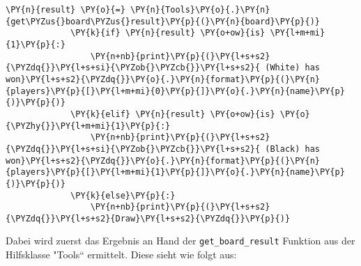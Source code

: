 \begin{Verbatim}[commandchars=\\\{\}]
             \PY{n}{result} \PY{o}{=} \PY{n}{Tools}\PY{o}{.}\PY{n}{get\PYZus{}board\PYZus{}result}\PY{p}{(}\PY{n}{board}\PY{p}{)}
             \PY{k}{if} \PY{n}{result} \PY{o+ow}{is} \PY{l+m+mi}{1}\PY{p}{:}
                 \PY{n+nb}{print}\PY{p}{(}\PY{l+s+s2}{\PYZdq{}}\PY{l+s+si}{\PYZob{}\PYZcb{}}\PY{l+s+s2}{ (White) has won}\PY{l+s+s2}{\PYZdq{}}\PY{o}{.}\PY{n}{format}\PY{p}{(}\PY{n}{players}\PY{p}{[}\PY{l+m+mi}{0}\PY{p}{]}\PY{o}{.}\PY{n}{name}\PY{p}{)}\PY{p}{)}
             \PY{k}{elif} \PY{n}{result} \PY{o+ow}{is} \PY{o}{\PYZhy{}}\PY{l+m+mi}{1}\PY{p}{:}
                 \PY{n+nb}{print}\PY{p}{(}\PY{l+s+s2}{\PYZdq{}}\PY{l+s+si}{\PYZob{}\PYZcb{}}\PY{l+s+s2}{ (Black) has won}\PY{l+s+s2}{\PYZdq{}}\PY{o}{.}\PY{n}{format}\PY{p}{(}\PY{n}{players}\PY{p}{[}\PY{l+m+mi}{1}\PY{p}{]}\PY{o}{.}\PY{n}{name}\PY{p}{)}\PY{p}{)}
             \PY{k}{else}\PY{p}{:}
                 \PY{n+nb}{print}\PY{p}{(}\PY{l+s+s2}{\PYZdq{}}\PY{l+s+s2}{Draw}\PY{l+s+s2}{\PYZdq{}}\PY{p}{)}
\end{Verbatim}

    Dabei wird zuerst das Ergebnis an Hand der \texttt{get\_board\_result}
Funktion aus der Hilfsklasse "Tools`` ermittelt. Diese sieht wie folgt
aus:

